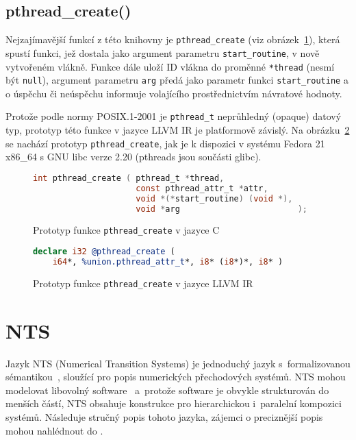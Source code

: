 \documentclass[10pt,a4paper,notitlepage]{report}
\begin{document}
\subsection{pthread_create()}
Nejzajímavější funkcí z této knihovny je \texttt{pthread\_create}\cite{man-pthread-create} (viz obrázek~\ref{fig:pthread-create-c}), která spustí funkci, jež dostala jako argument parametru \texttt{start\_routine}, v nově vytvořeném vlákně. Funkce dále uloží ID vlákna do proměnné \texttt{*thread} (nesmí být \texttt{null}), argument parametru \texttt{arg} předá jako parametr funkci \texttt{start\_routine} a o úspěchu či neúspěchu informuje volajícího prostřednictvím návratové hodnoty.

Protože podle normy POSIX.1-2001  je \texttt{pthread\_t} neprůhledný (opaque) datový typ, prototyp této funkce v jazyce LLVM IR je platformově závislý. Na obrázku~\ref{fig:pthread-create-llvm} se nachází prototyp \texttt{pthread\_create}, jak je k dispozici v systému Fedora 21 x86_64 s GNU libc verze 2.20 (pthreads jsou součásti glibc).

\begin{figure}[h!]
\begin{lstlisting}[language=C]
int pthread_create ( pthread_t *thread,
                     const pthread_attr_t *attr,
                     void *(*start_routine) (void *),
                     void *arg                        );
\end{lstlisting}
\label{fig:pthread-create-c}
\caption{Prototyp funkce \texttt{pthread_create} v jazyce C}
\end{figure}

\begin{figure}[h!]
\begin{lstlisting}[language=llvm]
declare i32 @pthread_create (
	i64*, %union.pthread_attr_t*, i8* (i8*)*, i8* )
\end{lstlisting}
\label{fig:pthread-create-llvm}
\caption{Prototyp funkce \texttt{pthread_create} v jazyce LLVM IR}
\end{figure}

\section{NTS}
Jazyk NTS (Numerical Transition Systems) je jednoduchý jazyk s~formalizovanou sémantikou~\cite{NTSref}, sloužící pro popis numerických přechodových systémů. NTS mohou modelovat libovolný software~\cite{NTSref} a~protože software je obvykle strukturován do menších částí, NTS obsahuje konstrukce pro hierarchickou i~paralelní kompozici systémů. Následuje stručný popis tohoto jazyka, zájemci o preciznější popis mohou nahlédnout do \cite{NTSref}.
\end{document}
